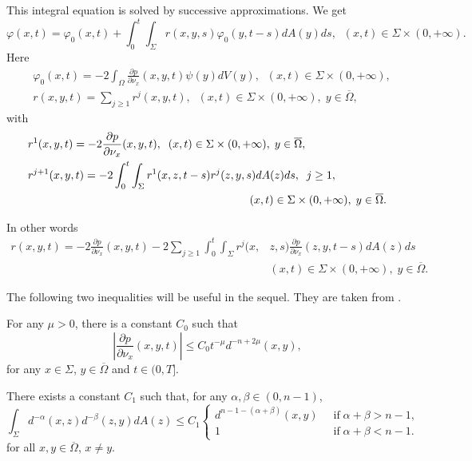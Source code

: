 \documentclass{birkjour}
\begin{document}
This integral equation is solved by successive approximations. We get
\[
\varphi (x,t)=\varphi _0(x,t)+\int_0^t\int_\Sigma r(x,y,s)\varphi _0(y,t-s)dA(y)ds,\;\; (x,t)\in \Sigma \times (0,+\infty ).
\]
Here
\begin{align*}
&\varphi _0(x,t)=-2\int_\Omega \frac{\partial p}{\partial \nu _x}(x,y,t)\psi (y)dV(y),\;\; (x,t)\in \Sigma \times (0,+\infty ),
\\
&r(x,y,t)=\sum_{j\geq 1} r^j(x,y,t),\;\; (x,t)\in \Sigma \times (0,+\infty ),\; y\in \overline{\Omega},
\end{align*}
with
\begin{align*}
&r^1(x,y,t)=-2\frac{\partial p}{\partial \nu _x}(x,y,t),\;\; (x,t)\in \Sigma \times (0,+\infty ),\; y\in \overline{\Omega},
\\
&r^{j+1}(x,y,t)=-2\int_0^t\int_\Sigma r^1(x,z,t-s)r^j(z,y,s)dA(z)ds,\;\; j\geq 1,
\\
&\hskip 7cm (x,t)\in \Sigma \times (0,+\infty ),\; y\in \overline{\Omega}.
\end{align*}

In other words
\begin{align*}
r(x,y,t)=-2\frac{\partial p}{\partial \nu _x}(x,y,t) -2\sum_{j\geq 1}\int_0^t\int_\Sigma r^j(x,&z,s)\frac{\partial p}{\partial \nu _x}(z,y,t-s)dA(z)ds
\\ &(x,t)\in \Sigma \times (0,+\infty ), \; y\in \overline{\Omega}.
\end{align*}

The following two inequalities will be useful in the sequel. They are taken from \cite{Cha}.

\smallskip
For any $\mu >0$, there is a constant $C_0$ such that
\begin{equation}\label{e3}
\left| \frac{\partial p}{\partial \nu _x}(x,y,t) \right|\leq C_0t^{-\mu}d^{-n+2\mu}(x,y),
\end{equation}
for any $x\in \Sigma$, $y\in \overline{\Omega}$ and $t\in (0,T]$.

\smallskip
There exists a constant $C_1$ such that, for any $\alpha ,\beta \in (0,n-1)$,
\begin{equation}\label{e4}
\int_\Sigma d^{-\alpha}(x,z)d^{-\beta}(z,y)dA(z)\leq C_1\left\{ \begin{array}{ll} d^{n-1-(\alpha +\beta )}(x,y)&\;\; \textrm{if}\; \alpha +\beta > n-1,\\ 1 &\;\; \textrm{if}\; \alpha +\beta < n-1.\end{array}\right.
\end{equation}
for all $x,y\in \overline{\Omega}$, $x\neq y$.
\end{document}

